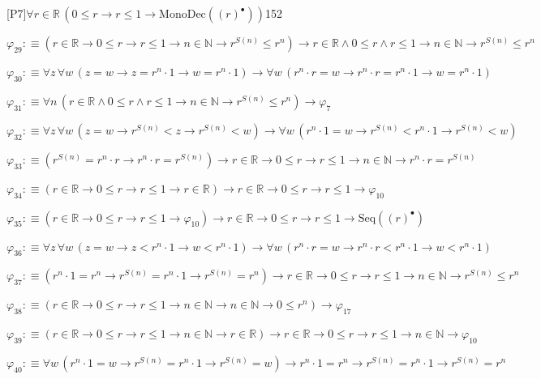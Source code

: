 \begin{fullproof}{[P7]}{$\forall r \in \mathbb{R}\,(0 \leq r \to r \leq 1 \to \mathrm{MonoDec}({(r)^{\bullet}}))$}{152}
\begin{abbrevlist}
\item $\varphi_{29} :\equiv (r \in \mathbb{R} \to 0 \leq r \to r \leq 1 \to n \in \mathbb{N} \to {{r}^{S(n)}} \leq {{r}^{n}}) \to r \in \mathbb{R} \land 0 \leq r \land r \leq 1 \to n \in \mathbb{N} \to {{r}^{S(n)}} \leq {{r}^{n}}$
\item $\varphi_{30} :\equiv \forall z\,\forall w\,(z = w \to z = {{r}^{n}} \cdot 1 \to w = {{r}^{n}} \cdot 1) \to \forall w\,({{r}^{n}} \cdot r = w \to {{r}^{n}} \cdot r = {{r}^{n}} \cdot 1 \to w = {{r}^{n}} \cdot 1)$
\item $\varphi_{31} :\equiv \forall n\,(r \in \mathbb{R} \land 0 \leq r \land r \leq 1 \to n \in \mathbb{N} \to {{r}^{S(n)}} \leq {{r}^{n}}) \to \varphi_{7}$
\item $\varphi_{32} :\equiv \forall z\,\forall w\,(z = w \to {{r}^{S(n)}} < z \to {{r}^{S(n)}} < w) \to \forall w\,({{r}^{n}} \cdot 1 = w \to {{r}^{S(n)}} < {{r}^{n}} \cdot 1 \to {{r}^{S(n)}} < w)$
\item $\varphi_{33} :\equiv ({{r}^{S(n)}} = {{r}^{n}} \cdot r \to {{r}^{n}} \cdot r = {{r}^{S(n)}}) \to r \in \mathbb{R} \to 0 \leq r \to r \leq 1 \to n \in \mathbb{N} \to {{r}^{n}} \cdot r = {{r}^{S(n)}}$
\item $\varphi_{34} :\equiv (r \in \mathbb{R} \to 0 \leq r \to r \leq 1 \to r \in \mathbb{R}) \to r \in \mathbb{R} \to 0 \leq r \to r \leq 1 \to \varphi_{10}$
\item $\varphi_{35} :\equiv (r \in \mathbb{R} \to 0 \leq r \to r \leq 1 \to \varphi_{10}) \to r \in \mathbb{R} \to 0 \leq r \to r \leq 1 \to \mathrm{Seq}({(r)^{\bullet}})$
\item $\varphi_{36} :\equiv \forall z\,\forall w\,(z = w \to z < {{r}^{n}} \cdot 1 \to w < {{r}^{n}} \cdot 1) \to \forall w\,({{r}^{n}} \cdot r = w \to {{r}^{n}} \cdot r < {{r}^{n}} \cdot 1 \to w < {{r}^{n}} \cdot 1)$
\item $\varphi_{37} :\equiv ({{r}^{n}} \cdot 1 = {{r}^{n}} \to {{r}^{S(n)}} = {{r}^{n}} \cdot 1 \to {{r}^{S(n)}} = {{r}^{n}}) \to r \in \mathbb{R} \to 0 \leq r \to r \leq 1 \to n \in \mathbb{N} \to {{r}^{S(n)}} \leq {{r}^{n}}$
\item $\varphi_{38} :\equiv (r \in \mathbb{R} \to 0 \leq r \to r \leq 1 \to n \in \mathbb{N} \to n \in \mathbb{N} \to 0 \leq {{r}^{n}}) \to \varphi_{17}$
\item $\varphi_{39} :\equiv (r \in \mathbb{R} \to 0 \leq r \to r \leq 1 \to n \in \mathbb{N} \to r \in \mathbb{R}) \to r \in \mathbb{R} \to 0 \leq r \to r \leq 1 \to n \in \mathbb{N} \to \varphi_{10}$
\item $\varphi_{40} :\equiv \forall w\,({{r}^{n}} \cdot 1 = w \to {{r}^{S(n)}} = {{r}^{n}} \cdot 1 \to {{r}^{S(n)}} = w) \to {{r}^{n}} \cdot 1 = {{r}^{n}} \to {{r}^{S(n)}} = {{r}^{n}} \cdot 1 \to {{r}^{S(n)}} = {{r}^{n}}$

\end{abbrevlist}
\end{fullproof}

